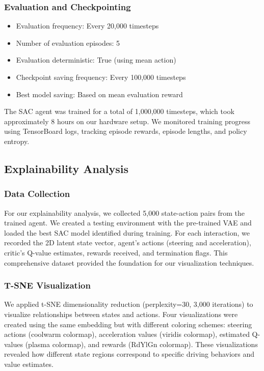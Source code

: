 \documentclass[conference]{IEEEtran}
\begin{document}
\subsubsection{Evaluation and Checkpointing}
\begin{itemize}
    \item Evaluation frequency: Every 20,000 timesteps
    \item Number of evaluation episodes: 5
    \item Evaluation deterministic: True (using mean action)
    \item Checkpoint saving frequency: Every 100,000 timesteps
    \item Best model saving: Based on mean evaluation reward
\end{itemize}

The SAC agent was trained for a total of 1,000,000 timesteps, which took approximately 8 hours on our hardware setup. We monitored training progress using TensorBoard logs, tracking episode rewards, episode lengths, and policy entropy.

\subsection{Explainability Analysis}

\subsubsection{Data Collection}
For our explainability analysis, we collected 5,000 state-action pairs from the trained agent. We created a testing environment with the pre-trained VAE and loaded the best SAC model identified during training. For each interaction, we recorded the 2D latent state vector, agent's actions (steering and acceleration), critic's Q-value estimates, rewards received, and termination flags. This comprehensive dataset provided the foundation for our visualization techniques.

\subsubsection{T-SNE Visualization}
We applied t-SNE dimensionality reduction (perplexity=30, 3,000 iterations) to visualize relationships between states and actions. Four visualizations were created using the same embedding but with different coloring schemes: steering actions (coolwarm colormap), acceleration values (viridis colormap), estimated Q-values (plasma colormap), and rewards (RdYlGn colormap). These visualizations revealed how different state regions correspond to specific driving behaviors and value estimates.
\end{document}
